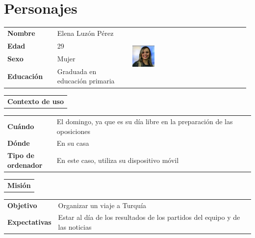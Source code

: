 \documentclass[11pt]{article}
\begin{document}
\section{Personajes}
\begin{table}[H]
  \centering
  \begin{tabular}{p{0.2\linewidth}|p{0.3\linewidth}p{0.475\linewidth}}
    \toprule
    \textbf{Nombre} & Elena Luzón Pérez  &\multirow{4}{*}{\begin{minipage}{1.\textwidth}\includegraphics[width=0.2\textwidth, height=30mm]{Elena}\end{minipage}}\\
    \textbf{Edad} & 29 & \\
    \textbf{Sexo} & Mujer & \\
    \textbf{Educación} & Graduada en educación primaria & \\
    \bottomrule
  \end{tabular}

  \begin{tabular}{l}
    \textbf{Contexto de uso} 
  \end{tabular}
  
  \begin{tabular}{p{0.2\linewidth}|p{0.8\linewidth}}
    \toprule
    \textbf{Cuándo} & El domingo, ya que es su día libre en la preparación de las oposiciones\\
    \textbf{Dónde}  & En su casa\\
    \textbf{Tipo de ordenador} & En este caso, utiliza su dispositivo móvil\\
    \bottomrule
  \end{tabular}

  \begin{tabular}{l}
    \textbf{Misión} 
  \end{tabular}
  
  \begin{tabular}{p{0.2\linewidth}|p{0.8\linewidth}}
    \toprule
    \textbf{Objetivo} & Organizar un viaje a Turquía\\
    \textbf{Expectativas}  & Estar al día de los resultados de los partidos del equipo y de las noticias \\
    \bottomrule
  \end{tabular}


\end{table}
\end{document}
